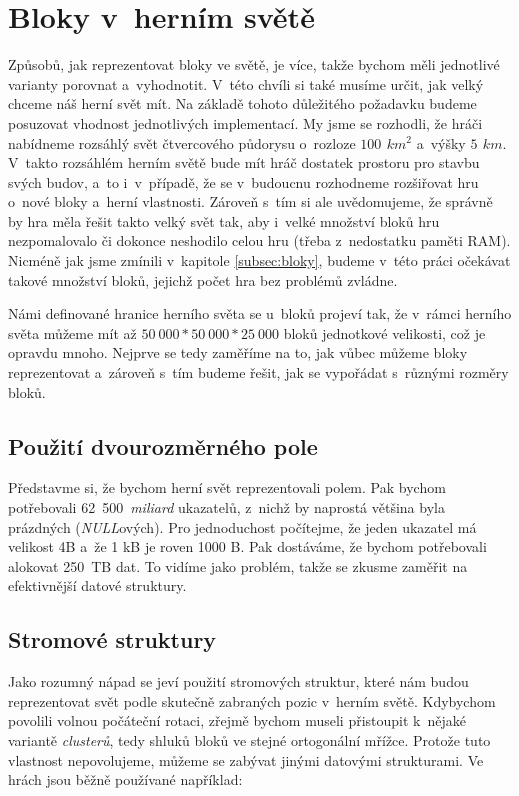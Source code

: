 \section{Bloky v~herním světě}
\label{sec:blocksWorld}

Způsobů, jak reprezentovat bloky ve světě, je více, takže bychom měli jednotlivé varianty porovnat a~vyhodnotit. V~této chvíli si také musíme určit, jak velký chceme náš herní svět mít. Na základě tohoto důležitého požadavku budeme posuzovat vhodnost jednotlivých implementací. My jsme se rozhodli, že hráči nabídneme rozsáhlý svět čtvercového půdorysu o~rozloze $100\,\ km^2$ a~výšky $5\,\ km$. V~takto rozsáhlém herním světě bude mít hráč dostatek prostoru pro stavbu svých budov, a~to i~v~případě, že se v~budoucnu rozhodneme rozšiřovat hru o~nové bloky a~herní vlastnosti. Zároveň s~tím si ale uvědomujeme, že správně by hra měla řešit takto velký svět tak, aby i~velké množství bloků hru nezpomalovalo či dokonce neshodilo celou hru (třeba z~nedostatku paměti RAM). Nicméně jak jsme zmínili v~kapitole \ref{subsec:bloky}, budeme v~této práci očekávat takové množství bloků, jejichž počet hra bez problémů zvládne.

Námi definované hranice herního světa se u~bloků projeví tak, že v~rámci herního světa můžeme mít až $50~000 * 50~000 * 25~000$ bloků jednotkové velikosti, což je opravdu mnoho. Nejprve se tedy zaměříme na to, jak vůbec můžeme bloky reprezentovat a~zároveň s~tím budeme řešit, jak se vypořádat s~různými rozměry bloků.

\subsection{Použití dvourozměrného pole}

Představme si, že bychom herní svět reprezentovali polem. Pak bychom potřebovali 62~500~\textit{miliard} ukazatelů, z~nichž by naprostá většina byla prázdných (\textit{NULL}ových). Pro jednoduchost počítejme, že jeden ukazatel má velikost 4B a~že 1 kB je roven 1000 B. Pak dostáváme, že bychom potřebovali alokovat 250~TB dat. To vidíme jako problém, takže se zkusme zaměřit na efektivnější datové struktury.

\subsection{Stromové struktury}
\label{subsec:trees}

Jako rozumný nápad se jeví použití stromových struktur, které nám budou reprezentovat svět podle skutečně zabraných pozic v~herním světě. Kdybychom povolili volnou počáteční rotaci, zřejmě bychom museli přistoupit k~nějaké variantě \textit{clusterů}, tedy shluků bloků ve stejné ortogonální mřížce. Protože tuto vlastnost nepovolujeme, můžeme se zabývat jinými datovými strukturami. Ve hrách jsou běžně používané například:


